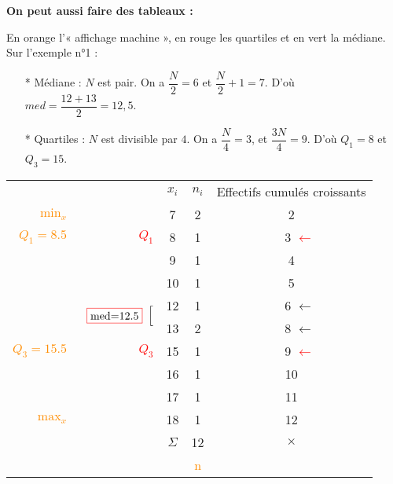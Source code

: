 \newpage

\textbf{On peut aussi faire des tableaux :}


En orange l'« affichage machine », en rouge les quartiles et en vert la médiane. \\

Sur l'exemple n°1 : \\

\begin{itemize}
\item[*] Médiane : $N$ est pair. On a $\dfrac{N}{2} = 6$ et $\dfrac{N}{2} + 1 = 7$. D'où $med = \dfrac{12 + 13}{2} = 12,5$. \\
\item[*] Quartiles : $N$ est divisible par $4$. On a $\dfrac{N}{4} = 3$, et $\dfrac{3N}{4} = 9$. D'où $Q_1 = 8$ et $Q_3 =15$. \\
\end{itemize}

\begin{tabular}{rrc|c|c}
& & $x_i$ & $n_i$ & Effectifs cumulés croissants \\
\cline{3-5}
\textcolor{DarkOrange}{$\mathrm{min}_{x}$}&   & 7 & 2 & 2 \\
\textcolor{DarkOrange}{$Q_1 = 8.5$}& \textcolor{Red}{$Q_1$}
    & 8 & 1 & $\quad$ 3 \textcolor{red}{$\leftarrow$}\\
& & 9 & 1 & 4 \\
& & 10 & 1 & 5 \\
& \multirow{2}{2cm}{{\color{VertClair}
 $\left. \begin{array}{c}
          \mathrm{\fcolorbox{red}{white}{med=12.5}}\\
          \end{array}
  \right[$
 } }                  & 12 & 1 
           & $\quad$ 6 \textcolor{VertClair}{$\leftarrow$} \\
& & 13 & 2 & $\quad$ 8 \textcolor{VertClair}{$\leftarrow$}  \\
\textcolor{DarkOrange}{$Q_3 = 15.5$}
    &  \textcolor{Red}{$Q_3$}& 15 & 1 & $\quad$ 9 \textcolor{red}{$\leftarrow$} \\
& & 16 & 1 & 10 \\
& & 17 & 1 & 11 \\
\textcolor{DarkOrange}{$\mathrm{max}_x$}& & 18 & 1 & 12 \\
\cline{3-5}
& &  $\Sigma$ & 12 & {\Large $\times$} \\
& &  &\textcolor{DarkOrange}{n}& \\
\end{tabular}

